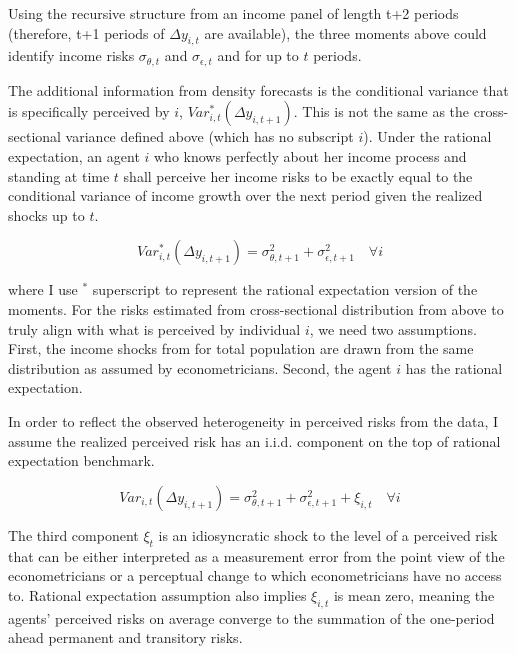 \documentclass[12pt,notitlepage,onecolumn,aps,pra]{article}
\begin{document}
Using the recursive structure from an income panel of length t+2 periods
(therefore, t+1 periods of \(\Delta y_{i,t}\) are available), the three
moments above could identify income risks \(\sigma_{\theta,t}\) and
\(\sigma_{\epsilon,t}\) and for up to \(t\) periods.

The additional information from density forecasts is the conditional
variance that is specifically perceived by \(i\),
\(Var^*_{i,t}(\Delta y_{i,t+1})\). This is not the same as the
cross-sectional variance defined above (which has no subscript \(i\)).
Under the rational expectation, an agent \(i\) who knows perfectly about
her income process and standing at time \(t\) shall perceive her income
risks to be exactly equal to the conditional variance of income growth
over the next period given the realized shocks up to \(t\).

\begin{equation}
\label{VarCRE}
 Var^*_{i,t}(\Delta y_{i,t+1}) = \sigma^2_{\theta,t+1} + \sigma^2_{\epsilon,t+1} \quad \forall i
\end{equation}

where I use \({}^*\) superscript to represent the rational expectation
version of the moments. For the risks estimated from cross-sectional
distribution from above to truly align with what is perceived by
individual \(i\), we need two assumptions. First, the income shocks from
for total population are drawn from the same distribution as assumed by
econometricians. Second, the agent \(i\) has the rational expectation.

In order to reflect the observed heterogeneity in perceived risks from
the data, I assume the realized perceived risk has an i.i.d. component
on the top of rational expectation benchmark.

\begin{equation}
\label{VarCIRE}
 Var_{i,t}(\Delta y_{i,t+1}) = \sigma^2_{\theta,t+1} + \sigma^2_{\epsilon,t+1} + \xi_{i,t} \quad \forall i
\end{equation}

The third component \(\xi_t\) is an idiosyncratic shock to the level of
a perceived risk that can be either interpreted as a measurement error
from the point view of the econometricians or a perceptual change to
which econometricians have no access to. Rational expectation assumption
also implies \(\xi_{i,t}\) is mean zero, meaning the agents' perceived
risks on average converge to the summation of the one-period ahead
permanent and transitory risks.
\end{document}
